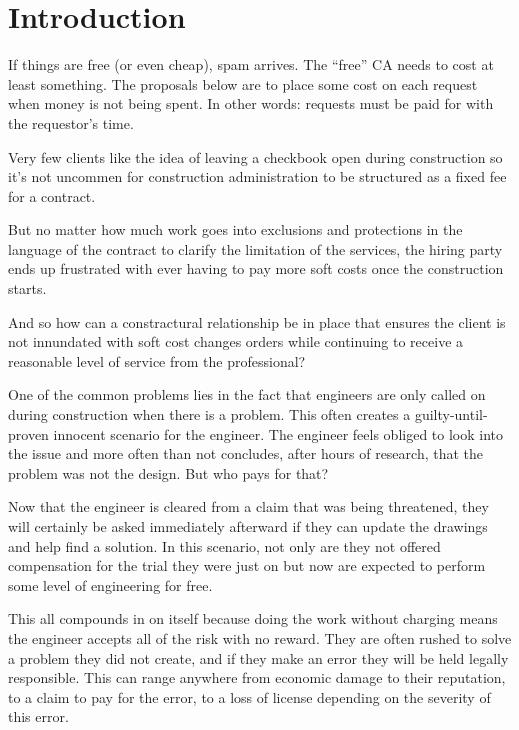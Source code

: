 
\section{Introduction}\label{sec:intro}
If things are free (or even cheap), spam arrives. The “free” CA needs to cost
at least something. The proposals below are to place some cost on each request
when money is not being spent. In other words: requests must be paid for with
the requestor’s time.

\begin{multicols}{2}

Very few clients like the idea of leaving a checkbook open during construction
so it's not uncommen for construction administration to be structured as a
fixed fee for a contract.

But no matter how much work goes into exclusions and protections in the
language of the contract to clarify the limitation of the services, the hiring
party ends up frustrated with ever having to pay more soft costs once the
construction starts.

And so how can a constractural relationship be in place that ensures the client
is not innundated with soft cost changes orders while continuing to receive a
reasonable level of service from the professional?

One of the common problems lies in the fact that engineers are only called on
during construction when there is a problem. This often creates a
guilty-until-proven innocent scenario for the engineer. The engineer feels
obliged to look into the issue and more often than not concludes, after hours
of research, that the problem was not the design. But who pays for that?

Now that the engineer is cleared from a claim that was being threatened, they
will certainly be asked immediately afterward if they can update the drawings
and help find a solution. In this scenario, not only are they not offered
compensation for the trial they were just on but now are expected to perform
some level of engineering for free.

This all compounds in on itself because doing the work without charging means
the engineer accepts all of the risk with no reward. They are often rushed to
solve a problem they did not create, and if they make an error they will be
held legally responsible. This can range anywhere from economic damage to their
reputation, to a claim to pay for the error, to a loss of license depending on
the severity of this error.


\end{multicols}
